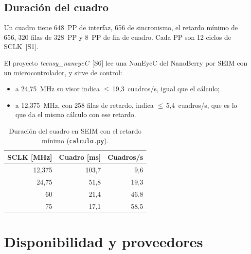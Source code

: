 \documentclass[11pt,a4paper]{article}
\begin{document}
\subsection{Duración del cuadro}
Un cuadro tiene 648~PP de interfaz, 656 de sincronismo, el retardo mínimo de 656, 320 filas de 328~PP y 8~PP de fin de cuadro. Cada PP son 12 ciclos de SCLK~[S1].

El proyecto \emph{teensy\_naneyeC}~[S6] lee una NanEyeC del NanoBerry por SEIM con un microcontrolador, y sirve de control:
\begin{itemize}
  \item a 24,75~MHz su visor indica $\leq$\,19,3~cuadros/s, igual que el cálculo;
  \item a 12,375~MHz, con 258 filas de retardo, indica $\leq$\,5,4~cuadros/s, que es lo que da el mismo cálculo con ese retardo.
\end{itemize}

\begin{table}[H]\centering
\caption{Duración del cuadro en SEIM con el retardo mínimo (\texttt{calculo.py}).}
\small
\begin{tabular}{r r r}
\toprule
SCLK [MHz] & Cuadro [ms] & Cuadros/s \\
\midrule
12,375 & 103,7 & 9,6 \\
24,75  & 51,8  & 19,3 \\
60     & 21,4  & 46,8 \\
75     & 17,1  & 58,5 \\
\bottomrule
\end{tabular}
\end{table}

\section{Disponibilidad y proveedores}\label{sec:dispo}
\end{document}
